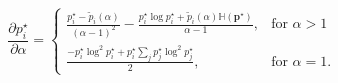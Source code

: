 \begin{equation}\label{eq:final_gradient_alpha_supp}
    \frac{\partial p_i^{\star}}{\partial \alpha} =
    \left\{
    \begin{array}{ll}
        \frac{p_i^{\star} - \tilde{p}_i(\alpha)}{(\alpha-1)^2} - \frac{p_i^{\star}\log p_i^{\star} + \tilde{p}_i(\alpha)\mathbb H(\bm{p}^{\star})}{\alpha-1}, & \text{for $\alpha > 1$}  \\
        \frac{- p_i^{\star}\log^2 p_i^{\star} + p_i^{\star} \sum_j p_j^{\star}\log^2 p_j^{\star}}{2},                                                         & \text{for $\alpha = 1$.}
    \end{array}
    \right.
\end{equation}

\cleardoublepage
\singlespacing